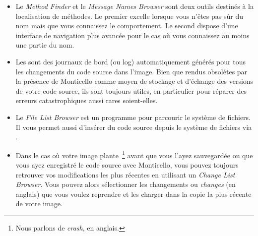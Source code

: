 \documentclass[a4paper,10pt,twoside]{book}
\begin{document}
\begin{itemize}
  \item Le \emph{Method Finder} et le \emph{Message Names Browser} sont 
deux outils destinés à la localisation de méthodes. Le
premier excelle lorsque vous n'êtes pas sûr du nom mais que vous
connaissez le comportement.
Le second dispose d'une interface de navigation plus avancée pour le cas où
vous connaissez au moins une partie du nom.
  \item Les \changesets sont des journaux de bord (ou log) automatiquement générés pour 
tous les changements du code source dans l'image.
Bien que rendus obsolètes par la présence de Monticello comme
moyen de stockage et d'échange des versions de votre code source,
ils sont toujours utiles, en particulier pour réparer des erreurs
catastrophiques aussi rares soient-elles.
  \item Le \emph{File List Browser} est un programme pour parcourir le
système de fichiers. Il vous permet aussi d'insérer du code
source depuis le système de fichiers via .
  \item Dans le cas où votre image plante~\footnote{Nous parlons de \emph{crash}, en anglais.} avant que
vous l'ayez sauvegardée ou que vous ayez enregistré le code source
avec Monticello, vous pouvez toujours retrouver vos modifications les
plus récentes en utilisant un \emph{Change List Browser}.
Vous pouvez alors sélectionner les changements ou \emph{changes} (en anglais) que vous voulez 
reprendre et les charger dans la copie la plus récente de votre image.
\end{itemize}

\ifx\wholebook\relax\else
\end{document}
